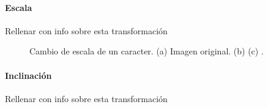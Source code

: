 		\paragraph{Escala}
			
			Rellenar con info sobre esta transformación
			
		\begin{figure}[htbp]
			\centering
			\caption[Cambio de escala de un caracter]{Cambio de escala de un caracter. (a) Imagen original. (b)  (c) .}
			\label{fig: Transformacion Afin - Escala}
		\end{figure}	
			
		\paragraph{Inclinación}
		
			Rellenar con info sobre esta transformación
			

